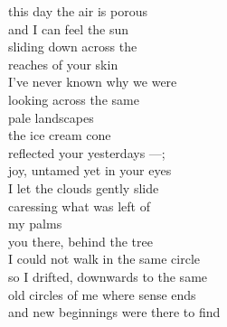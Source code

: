 this day the air is porous\\
and I can feel the sun\\
sliding down across the\\
reaches of your skin\\
I've never known why we were\\
looking across the same\\
pale landscapes\\

the ice cream cone\\
reflected your yesterdays ---;\\
joy, untamed yet in your eyes\\
I let the clouds gently slide\\
caressing what was left of\\
my palms\\

you there, behind the tree\\
I could not walk in the same circle\\
so I drifted, downwards to the same\\
old circles of me where sense ends\\
and new beginnings were there to find\\
